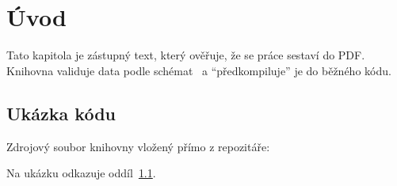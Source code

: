 \chapter{Úvod}
\label{chap:uvod}
Tato kapitola je zástupný text, který ověřuje, že se práce sestaví do PDF. Knihovna \pvl{} validuje data podle schémat~\cite{standardschema} a \enquote{předkompiluje} je do běžného kódu.

\section{Ukázka kódu}
\label{sec:ukazka}
Zdrojový soubor knihovny vložený přímo z repozitáře:

Na ukázku odkazuje oddíl~\ref{sec:ukazka}.
